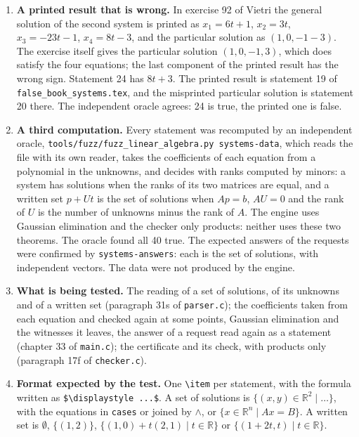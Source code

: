 \documentclass[11pt,a4paper]{article}
\begin{document}
\begin{enumerate}
\item \textbf{A printed result that is wrong.} In exercise 92 of Vietri the general solution of the second system is printed as $x_{1} = 6t + 1$, $x_{2} = 3t$, $x_{3} = -23t - 1$, $x_{4} = 8t - 3$, and the particular solution as $(1, 0, -1 - 3)$. The exercise itself gives the particular solution $(1, 0, -1, 3)$, which does satisfy the four equations; the last component of the printed result has the wrong sign. Statement 24 has $8t + 3$. The printed result is statement 19 of \texttt{false\_book\_systems.tex}, and the misprinted particular solution is statement 20 there. The independent oracle agrees: 24 is true, the printed one is false.

\item \textbf{A third computation.} Every statement was recomputed by an independent oracle, \texttt{tools/fuzz/fuzz\_linear\_algebra.py systems-data}, which reads the file with its own reader, takes the coefficients of each equation from a polynomial in the unknowns, and decides with ranks computed by minors: a system has solutions when the ranks of its two matrices are equal, and a written set $p + U t$ is the set of solutions when $A p = b$, $A U = 0$ and the rank of $U$ is the number of unknowns minus the rank of $A$. The engine uses Gaussian elimination and the checker only products: neither uses these two theorems. The oracle found all 40 true. The expected answers of the requests were confirmed by \texttt{systems-answers}: each is the set of solutions, with independent vectors. The data were not produced by the engine.

\item \textbf{What is being tested.} The reading of a set of solutions, of its unknowns and of a written set (paragraph 31s of \texttt{parser.c}); the coefficients taken from each equation and checked again at some points, Gaussian elimination and the witnesses it leaves, the answer of a request read again as a statement (chapter 33 of \texttt{main.c}); the certificate and its check, with products only (paragraph 17f of \texttt{checker.c}).

\item \textbf{Format expected by the test.} One \texttt{\textbackslash item} per statement, with the formula written as \texttt{\$\textbackslash displaystyle ...\$}. A set of solutions is $\{(x, y) \in \mathbb{R}^{2} \mid \ldots\}$, with the equations in \texttt{cases} or joined by $\land$, or $\{x \in \mathbb{R}^{n} \mid A x = B\}$. A written set is $\emptyset$, $\{(1, 2)\}$, $\{(1, 0) + t (2, 1) \mid t \in \mathbb{R}\}$ or $\{(1 + 2t, t) \mid t \in \mathbb{R}\}$.


\end{enumerate}
\end{document}
